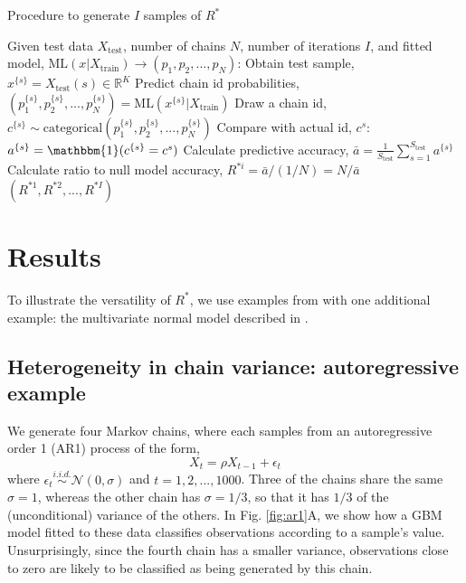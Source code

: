 \documentclass{article}
\begin{document}
\begin{algorithm}[tb]
	\caption{Procedure to generate $I$ samples of $R^*$}
	\label{alg:R_star_uncertainty}
	\begin{algorithmic}
		\STATE Given test data $X_\text{test}$, number of chains $N$, number of iterations $I$, and fitted
		\STATE model, $\text{ML}(x|X_\text{train})\rightarrow(p_1,p_2,...,p_N)$:
		\STATE Obtain test sample, $x^{\{s\}}=X_\text{test}(s)\in \mathbb{R}^K$
		\STATE Predict chain id probabilities, $(p_1^{\{s\}},p_2^{\{s\}},...,p_N^{\{s\}})= \text{ML}(x^{\{s\}}|X_\text{train})$
		\STATE Draw a chain id, $c^{\{s\}} \sim \text{categorical}(p_1^{\{s\}},p_2^{\{s\}},...,p_N^{\{s\}})$
		\STATE Compare with actual id, $c^s$: $a^{\{s\}}=\mathbbm{1}(c^{\{s\}}=c^s)$
		\ENDFOR
		\STATE Calculate predictive accuracy, $\bar{a} = \frac{1}{S_\text{test}} \sum_{s=1}^{S_\text{test}} a^{\{s\}}$
		\STATE Calculate ratio to null model accuracy, $R^{*i} = \bar{a} / (1 / N) = N/\bar{a}$
		\ENDFOR
		\RETURN $(R^{*1},R^{*2},...,R^{*I})$
	\end{algorithmic}
\end{algorithm}

\section{Results}\label{sec:results}
To illustrate the versatility of $R^*$, we use examples from \cite{vehtari2019rank} with one additional example: the multivariate normal model described in \cite{hoffman2014no}.

\subsection{Heterogeneity in chain variance: autoregressive example}\label{sec:heterogeneity}
We generate four Markov chains, where each samples from an autoregressive order 1 (AR1) process of the form,
%
\begin{equation}
X_t = \rho X_{t-1} + \epsilon_t
\end{equation}
%
where $\epsilon_t\stackrel{i.i.d.}{\sim}\mathcal{N}(0, \sigma)$ and $t=1,2,...,1000$. Three of the chains share the same $\sigma=1$, whereas the other chain has $\sigma=1/3$, so that it has $1/3$ of the (unconditional) variance of the others. In Fig. \ref{fig:ar1}A, we show how a GBM model fitted to these data classifies observations according to a sample's value. Unsurprisingly, since the fourth chain has a smaller variance, observations close to zero are likely to be classified as being generated by this chain.
\end{document}
